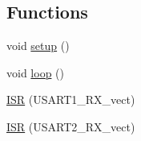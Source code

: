 \subsection*{Functions}
\begin{DoxyCompactItemize}
\item 
void \mbox{\hyperlink{_a_d_a_s___nav_u_8ino_a4fc01d736fe50cf5b977f755b675f11d}{setup}} ()
\item 
void \mbox{\hyperlink{_a_d_a_s___nav_u_8ino_afe461d27b9c48d5921c00d521181f12f}{loop}} ()
\item 
\mbox{\hyperlink{_a_d_a_s___nav_u_8ino_ae6e8a8009a9ae0c59f25a496d1cf5a84}{I\+SR}} (U\+S\+A\+R\+T1\+\_\+\+R\+X\+\_\+vect)
\item 
\mbox{\hyperlink{_a_d_a_s___nav_u_8ino_a63a86aad9ba2e355fe6380da553f554e}{I\+SR}} (U\+S\+A\+R\+T2\+\_\+\+R\+X\+\_\+vect)
\end{DoxyCompactItemize}
